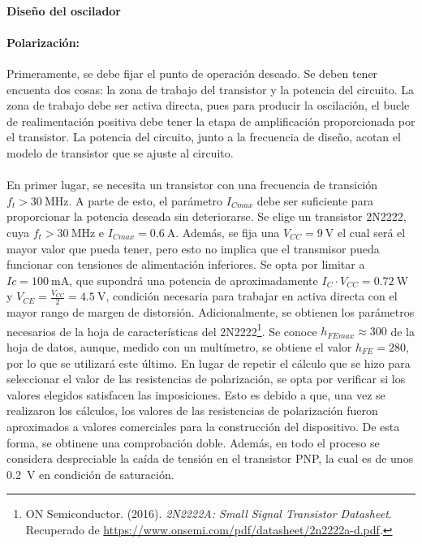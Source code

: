 \paragraph{Diseño del oscilador}
\paragraph{Polarizaci\'on:} %
Primeramente, se debe fijar el punto de operación deseado. Se deben tener encuenta dos cosas: la zona de trabajo del transistor y la potencia del circuito. La zona de trabajo debe ser activa directa, pues para producir la oscilación, el bucle de realimentación positiva debe tener la etapa de amplificación proporcionada por el transistor. La potencia del circuito, junto a la frecuencia de diseño, acotan el modelo de transistor que se ajuste al circuito.
\paragraph{}
En primer lugar, se necesita un transistor con una frecuencia de transición $f_t > \SI{30}{\mega\hertz}$. 
A parte de esto, el parámetro $I_{Cmax}$ debe ser suficiente para proporcionar la potencia deseada sin deteriorarse. Se elige un transistor 2N2222, cuya $f_t > \SI{30}{\mega\hertz}$ e $I_{Cmax} = \SI{0.6}{\ampere}$. Adem\'as, se fija una $V_{CC} = \SI{9}{\volt}$ el cual ser\'a el mayor valor que pueda tener, pero esto no implica que el transmisor pueda funcionar con tensiones de alimentaci\'on inferiores. Se opta por limitar a $Ic = \SI{100}{\milli\ampere}$, que supondr\'a una potencia de aproximadamente $I_C \cdot V_{CC} = \SI{0.72}{\watt}$ y $V_{CE} = \frac{V_{CC}}{2} = \SI{4.5}{\volt}$, condici\'on necesaria para trabajar en activa directa con el mayor rango de margen de distorsi\'on. Adicionalmente, se obtienen los par\'ametros necesarios de la hoja de características del 2N2222\footnote{ON Semiconductor. (2016). \textit{2N2222A: Small Signal Transistor Datasheet}. Recuperado de \url{https://www.onsemi.com/pdf/datasheet/2n2222a-d.pdf}.}.
Se conoce $h_{FEmax} \approx 300$ de la hoja de datos, aunque, medido con un mult\'imetro, se obtiene el valor $h_{FE} = 280$, por lo que se utilizar\'a este \'ultimo.
En lugar de repetir el cálculo que se hizo para seleccionar el valor de las resistencias de polarización, se opta por verificar si los valores elegidos satisfacen las imposiciones. Esto es debido a que, una vez se realizaron los c\'alculos, los valores de las resistencias de polarizaci\'on fueron aproximados a valores comerciales para la construcci\'on del dispositivo. De esta forma, se obtinene una comprobaci\'on doble. Adem\'as, en todo el proceso se considera despreciable la ca\'ida de tensi\'on en el transistor PNP, la cual es de unos \SI{.2}{\volt} en condici\'on de saturaci\'on.
